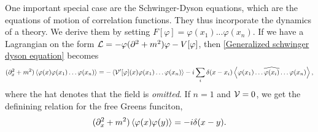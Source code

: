 One important special case are the Schwinger-Dyson equations, which are the equations of motion of correlation functions.
They thus incorporate the dynamics of a theory.
We derive them by setting $F[\varphi] = \varphi(x_1)...\varphi(x_n)$.
If we have a Lagrangian on the form $\mathcal{L} = - \varphi(\partial^2 + m^2)\varphi - V[\varphi]$, then \autoref{Generalized schwinger dyson equation} becomes
%
\begin{align*}
    (\partial^2_x + m^2)\braket{\varphi(x)\varphi(x_1)\dots \varphi(x_n)}
    = - \Braket{\mathcal{V}'[\varphi](x)\varphi(x_1)\dots\varphi(x_n)} 
    -i \sum_i\delta(x - x_i)
    \Braket{\varphi(x_1)\dots \widehat {\varphi(x_{i})} \dots \varphi(x_n)},
\end{align*}
%
where the hat denotes that the field is \emph{omitted}.
If $n = 1$ and $\mathcal{V} = 0$, we get the definining relation for the free Greens funciton,
%
\begin{equation}
    (\partial^2_x + m^2)\braket{\varphi(x)\varphi(y)}
    = -i \delta(x - y).
\end{equation}
%

